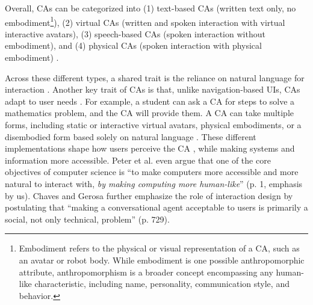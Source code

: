 \documentclass[sigconf,review,anonymous]{acmart}
\begin{document}
Overall, %
CAs can be categorized into (1) text-based CAs (written text only, no embodiment\footnote{Embodiment refers to the physical or visual representation of a CA, such as an avatar or robot body. While embodiment is one possible anthropomorphic attribute, anthropomorphism is a broader concept encompassing any human-like characteristic, including name, personality, communication style, and behavior.}), (2) virtual CAs (written and spoken interaction with virtual interactive avatars), (3) speech-based CAs (spoken interaction without embodiment), and (4) physical CAs (spoken interaction with physical embodiment) \citep{diederich_design_2022}. 

Across these different types, a shared trait is the reliance on natural language for interaction \citep{diederich_design_2022}. 
Another key trait of CAs is that, unlike navigation-based UIs, CAs adapt to user needs \citep{
folstad2017chatbots,jain2018evaluating}. For example, a student can ask a CA for steps to solve a mathematics problem, and the CA will provide them. A CA can take multiple forms, including static or interactive virtual avatars, physical embodiments, or a disembodied form based solely on natural language \citep{diederich_conversational_2019,diederich_design_2022}. These different implementations shape how users perceive the CA \citep{peter_benefits_2025}, while making systems and information more accessible. Peter et al. \cite{peter_benefits_2025} even argue that one of the core objectives of computer science is ``to make computers more accessible and more natural to interact with, \textit{by making computing more human-like}'' (p. 1, emphasis by us). Chaves and Gerosa \cite{chaves2021should} further emphasize the role of interaction design by postulating that ``making a conversational agent acceptable to users is primarily a social, not only technical, problem'' (p. 729).

\end{document}
